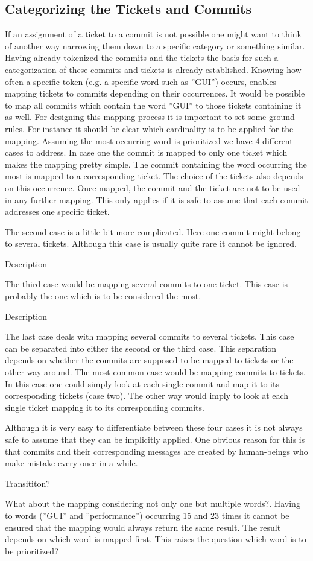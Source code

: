 \subsection{Categorizing the Tickets and Commits}

If an assignment of a ticket to a commit is not possible one might want to think of another way narrowing them down to a specific category or something similar. Having already tokenized the commits and the tickets the basis for such a categorization of these commits and tickets is already established. Knowing how often a specific token (e.g. a specific word such as ''GUI'') occurs, enables mapping tickets to commits depending on their occurrences. It would be possible to map all commits which contain the word ''GUI'' to those tickets containing it as well. For designing this mapping process it is important to set some ground rules. For instance it should be clear which cardinality is to be applied for the mapping. Assuming the most occurring word is prioritized we have 4 different cases to address.
In case one the commit is mapped to only one ticket which makes the mapping pretty simple. The commit containing the word occurring the most is mapped to a corresponding ticket. The choice of the tickets also depends on this occurrence. Once mapped, the commit and the ticket are not to be used in any further mapping. This only applies if it is safe to assume that each commit addresses one specific ticket.

The second case is a little bit more complicated. Here one commit might belong to several tickets. Although this case is usually quite rare it cannot be ignored.

Description 


The third case would be mapping several commits to one ticket. This case is probably the one which is to be considered the most. 

Description 


The last case deals with mapping several commits to several tickets. This case can be separated into either the second or the third case. This separation depends on whether the commits are supposed to be mapped to tickets or the other way around. The most common case would be mapping commits to tickets. In this case one could simply look at each single commit and map it to its corresponding tickets (case two). The other way would imply to look at each single ticket mapping it to its corresponding commits.

Although it is very easy to differentiate between these four cases it is not always safe to assume that they can be implicitly applied.  One obvious reason for this is that commits and their corresponding messages are created by human-beings who make mistake every once in a while.

Transititon?

What about the mapping considering not only one but multiple words?. Having to words (''GUI'' and ''performance'') occurring 15 and 23 times it cannot be ensured that the mapping would always return the same result. The result depends on which word is mapped first. This raises the question which word is to be prioritized? 

